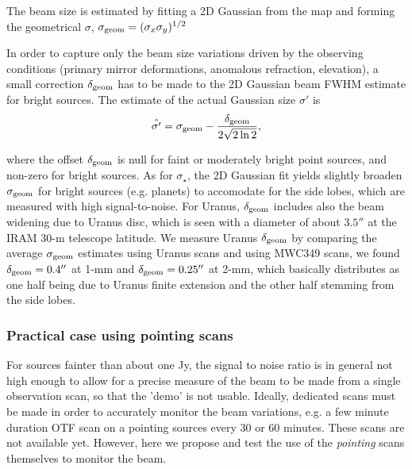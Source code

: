 The beam size is estimated by fitting a 2D Gaussian from the map and
forming the geometrical $\sigma$,
$\sigma_{\rm{geom}} = (\sigma_x \sigma_y)^{1/2}$

In order to capture only the beam size variations driven by the
observing conditions (primary mirror deformations, anomalous
refraction, elevation), a small correction $\delta_{\rm{geom}}$ has to be made to
the 2D Gaussian beam FWHM estimate for bright sources. The estimate of the
actual Gaussian size $\sigma '$ is
\begin{equation}
  \hat{\sigma '} = \sigma_{\rm{geom}} - \frac{\delta_{\rm{geom}}}{2\sqrt{2 \ln{2}}}, 
\end{equation} 

where the offset $\delta_{\rm{geom}}$ is null for faint or moderately
bright point sources, and non-zero for bright sources.
As for $\sigma_\star$,  the 2D Gaussian fit yields slightly broaden
$\sigma_{\rm{geom}}$ for bright sources (e.g. planets) to accomodate
for the side lobes, which are measured with high signal-to-noise.
For Uranus, $\delta_{\rm{geom}}$ includes also the beam widening due
to Uranus disc, which is seen with a diameter of about $3.5''$ at the
IRAM 30-m telescope latitude. We measure Uranus $\delta_{\rm{geom}}$
by comparing the average $\sigma_{\rm{geom}}$ estimates using Uranus
scans and using MWC349 scans, we found $\delta_{\rm{geom}} = 0.4''$ at
1-mm and $\delta_{\rm{geom}} = 0.25''$ at 2-mm, which basically
distributes as one half being due to Uranus finite extension and the
other half stemming from the side lobes. 


\subsubsection{Practical case using pointing scans}
\label{se:photocorr_pointing}

For sources fainter than about one Jy, the signal to noise ratio is in
general not high enough to allow for a precise measure of the beam to be
made from a single observation scan, so that the 'demo' is not
usable. Ideally, dedicated scans must be made in order to accurately
monitor the beam variations, e.g. a few minute duration OTF scan on a
pointing sources every 30 or 60 minutes. These scans are not available
yet. However, here we propose and test the use of the \emph{pointing} scans
themselves to monitor the beam.

